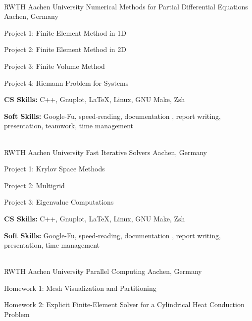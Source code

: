 \begin{cventries}
{\begin{cvitems}
      \end{cvitems}
    }\\
  \cventry
    {RWTH Aachen University} %
    {Numerical Methods for Partial Differential Equations} %
    {Aachen, Germany} %
    {} %
    {
      \begin{cvitems} %
        \item {Project 1: Finite Element Method in 1D}
        \item {Project 2: Finite Element Method in 2D}
        \item {Project 3: Finite Volume Method}
        \item {Project 4: Riemann Problem for Systems}
        \item {\textbf{CS Skills:} C++, Gnuplot, \LaTeX, Linux, GNU Make, Zsh}
        \item {\textbf{Soft Skills:} Google-Fu, speed-reading, documentation , report writing, presentation, teamwork, time management}
      \end{cvitems}
    }\\
  \cventry
    {RWTH Aachen University} %
    {Fast Iterative Solvers} %
    {Aachen, Germany} %
    {} %
    {
      \begin{cvitems} %
        \item {Project 1: Krylov Space Methods}
        \item {Project 2: Multigrid}
        \item {Project 3: Eigenvalue Computations}
        \item {\textbf{CS Skills:} C++, Gnuplot, \LaTeX, Linux, GNU Make, Zsh}
        \item {\textbf{Soft Skills:} Google-Fu, speed-reading, documentation , report writing, presentation, time management}
      \end{cvitems}
    }\\
  \cventry
    {RWTH Aachen University} %
    {Parallel Computing} %
    {Aachen, Germany} %
    {} %
    {
      \begin{cvitems} %
        \item {Homework 1: Mesh Visualization and Partitioning}
        \item {Homework 2: Explicit Finite-Element Solver for a Cylindrical Heat Conduction Problem}

\end{cvitems}}
\end{cventries}
